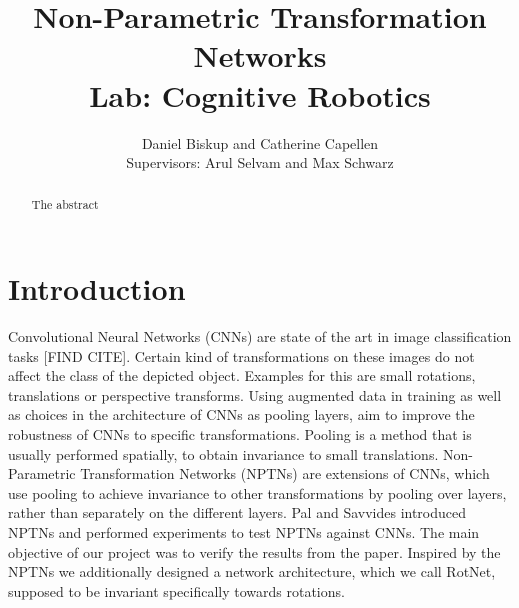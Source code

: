 \documentclass{llncs}
\begin{document}
%
\frontmatter          %
%
\pagestyle{headings}  %
%
\mainmatter              %
%
\title{Non-Parametric Transformation Networks \\Lab: Cognitive Robotics}
%
%  
%
\author{Daniel Biskup and Catherine Capellen
 \\Supervisors: Arul Selvam and Max Schwarz}
%
%
%

\maketitle              %

\begin{abstract}
The abstract 
\end{abstract}
%

\section{Introduction}
Convolutional Neural Networks (CNNs) are state of the art in image classification tasks [FIND CITE]. Certain kind of transformations on these images do not affect the class of the depicted object. 
Examples for this are small rotations, translations or perspective transforms.  
Using augmented data in training as well as choices in the architecture of CNNs as pooling layers, aim to improve the robustness of CNNs to specific transformations. 
Pooling is a method that is usually performed spatially, to obtain invariance to small translations. 
Non-Parametric Transformation Networks (NPTNs) are extensions of CNNs, which use pooling to achieve invariance to other transformations by pooling over layers, rather than separately on the different layers.
Pal and Savvides \cite{NPTN18} introduced NPTNs and performed experiments to test NPTNs against CNNs. The main objective of our project was to verify the results from the paper. 
Inspired by the NPTNs we additionally designed a network architecture, which we call RotNet, supposed to be invariant specifically towards rotations.
\end{document}
